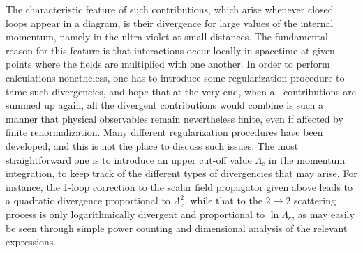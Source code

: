 \documentclass[a4paper,11pt]{article}
\begin{document}
The characteristic feature of such contributions, which arise whenever
closed loops appear in a diagram, is their divergence for large values 
of the internal momentum, namely in the ultra-violet at small distances.
The fundamental reason for this feature is that interactions occur locally
in spacetime at given points where the fields are multiplied with one another.
In order to perform calculations nonetheless, one has to introduce some
regularization procedure to tame such divergencies, and hope that at the
very end, when all contributions are summed up again, all the divergent
contributions would combine is such a manner that physical observables remain
nevertheless finite, even if affected by finite renormalization. Many different
regularization procedures have been developed, and this is not the place
to discuss such issues.\cite{Wein2,PS,IZ,Ramond} 
The most straightforward one is to introduce an
upper cut-off value $\Lambda_c$ in the momentum integration,
to keep track of the different types of divergencies that may arise.
For instance, the 1-loop correction to the scalar field propagator given
above leads to a quadratic divergence proportional to $\Lambda^2_c$,
while that to the $2\rightarrow 2$ scattering process is only
logarithmically divergent and proportional to $\ln\Lambda_c$,
as may easily be seen through simple power counting and dimensional analysis
of the relevant expressions.
\end{document}
